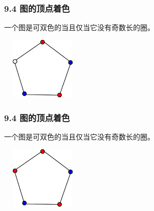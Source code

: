 \documentclass{beamer}
\begin{document}
\begin{CJK}{UTF8}{gbsn}
\begin{frame}
\begin{minipage}{0.45\linewidth}
  \end{minipage}
\end{frame}
\begin{frame}
  \frametitle{9.4 图的顶点着色}
  \begin{theorem9.4.1}
    一个图是可双色的当且仅当它没有奇数长的圈。
  \end{theorem9.4.1}
\vspace{1cm}
  \begin{minipage}{0.45\linewidth}
\includegraphics[width=4cm,height=3cm]{pentagon4}    
  \end{minipage}
  \begin{minipage}{0.45\linewidth}
   
  \end{minipage}
\end{frame}
\begin{frame}
  \frametitle{9.4 图的顶点着色}
  \begin{theorem9.4.1}
    一个图是可双色的当且仅当它没有奇数长的圈。
  \end{theorem9.4.1}
\vspace{1cm}
  \begin{minipage}{0.45\linewidth}
\includegraphics[width=4cm,height=3cm]{pentagon5}    
  \end{minipage}
  \begin{minipage}{0.45\linewidth}
   
  \end{minipage}
\end{frame}


\end{CJK}
\end{document}
